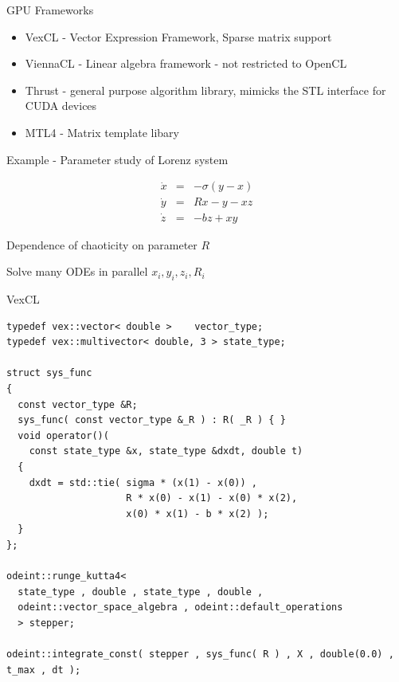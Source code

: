 \documentclass{beamer}
\newcommand{\heading}[1]{\centerline{\Large #1} \vspace{0.5em}}
\begin{document}
\begin{frame}[fragile]
 \heading{GPU Frameworks}

\begin{itemize}
 \item VexCL - Vector Expression Framework, Sparse matrix support
 \item ViennaCL - Linear algebra framework - not restricted to OpenCL
 \item Thrust - general purpose algorithm library, mimicks the STL interface for CUDA devices
 \item MTL4 - Matrix template libary
\end{itemize}

\end{frame}



\begin{frame}[fragile]
 \heading{Example - Parameter study of Lorenz system}

\begin{eqnarray*}
\dot{x} & = & - \sigma ( y - x ) \\
\dot{y} & = & R x - y - x z \\
\dot{z} & = & - b z + x y
\end{eqnarray*}

Dependence of chaoticity on parameter $R$

\vspace{2ex}

Solve many ODEs in parallel $x_i,y_i,z_i,R_i$

\end{frame}


\begin{frame}[fragile]
 \heading{VexCL}

\begin{lstlisting}[basicstyle=\scriptsize\ttfamily]
typedef vex::vector< double >    vector_type;
typedef vex::multivector< double, 3 > state_type;

struct sys_func
{
  const vector_type &R;
  sys_func( const vector_type &_R ) : R( _R ) { }
  void operator()(
    const state_type &x, state_type &dxdt, double t)
  {
    dxdt = std::tie( sigma * (x(1) - x(0)) ,
                     R * x(0) - x(1) - x(0) * x(2),
                     x(0) * x(1) - b * x(2) );
  }
};

odeint::runge_kutta4<
  state_type , double , state_type , double ,
  odeint::vector_space_algebra , odeint::default_operations
  > stepper;

odeint::integrate_const( stepper , sys_func( R ) , X , double(0.0) , t_max , dt );

\end{lstlisting}

\end{frame}
\end{document}

